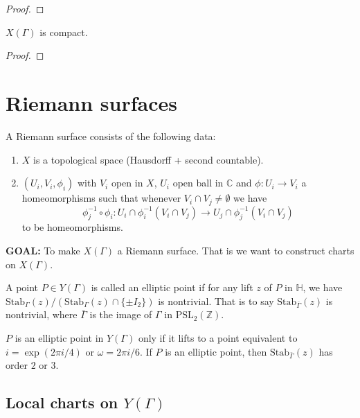 \documentclass[oneside, 12pt, ]{scrbook}
\newcommand{\CC}{\mathbb C}
\newcommand{\ZZ}{\mathbb Z}
\newcommand{\HH}{\mathbb{H}}
\newcommand{\Stab}{\mathrm{Stab}}
\theoremstyle{theorem}
\begin{document}
\begin{proof}

\end{proof}

\begin{proposition}
$X(\Gamma)$ is compact.
\end{proposition}

\begin{proof}

\end{proof}

\section{Riemann surfaces}

\begin{definition}
A Riemann surface consists of the following data: 
\begin{enumerate}
\item $X$ is a topological space (Hausdorff + second countable).
\item $(U_{i},V_{i}, \phi_{i})$ with $V_{i}$ open in $X$, $U_{i}$ open ball in $\CC$ and $\phi: U_{i} \rightarrow V_{i}$ a homeomorphisms such that whenever $V_{i} \cap V_{j} \neq \emptyset$ we have $$\phi_{j}^{-1} \circ \phi_{i} : U_{i} \cap \phi_{i}^{-1}(V_{i} \cap V_{j}) \rightarrow U_{j} \cap \phi_{j}^{-1} (V_{i} \cap V_{j})$$ to be homeomorphisms. 
\end{enumerate}
\end{definition}

\textbf{\textcolor{BrickRed}{GOAL}:} To make $X(\Gamma)$ a Riemann surface. That is we want to construct charts on $X(\Gamma)$.

\begin{definition}
A point $P \in Y(\Gamma)$ is called an elliptic point if for any lift $z$ of $P$ in $\HH$, we have $\Stab_{\Gamma}(z) / \left(  \Stab_{\Gamma}(z) \cap \{\pm I_{2}\} \right)$ is nontrivial. That is to say $\Stab_{\bar{\Gamma}}(z)$ is nontrivial, where $\bar{\Gamma}$ is the image of $\Gamma$ in $\mathrm{PSL}_{2}(\ZZ)$.
\end{definition}

$P$ is an elliptic point in $Y(\Gamma)$ only if it lifts to a point equivalent to $i = \exp(2 \pi i /4)$ or $\omega  = 2 \pi  i /6$. If $P$ is an elliptic point, then $\Stab_{\bar{\Gamma}}(z)$ has order $2$ or $3$. 

\subsection{Local charts on $Y(\Gamma)$}
\end{document}
